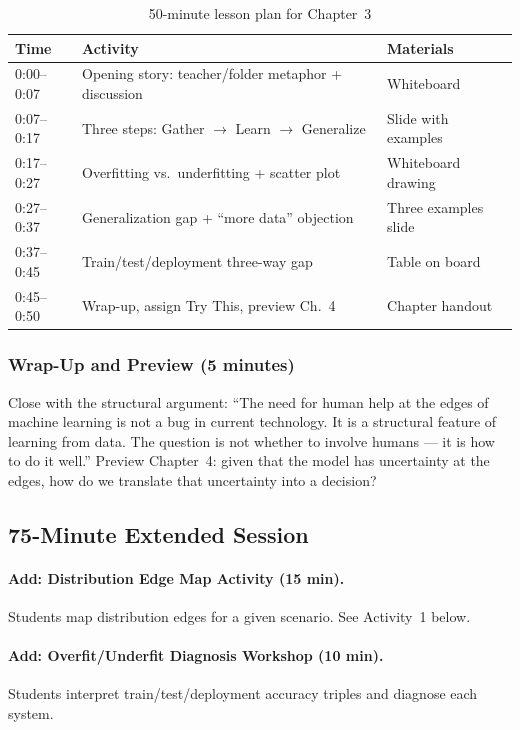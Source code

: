 \begin{table}[htbp]
\caption{50-minute lesson plan for Chapter~3}
\label{tab:lesson-plan-ch03}
\centering
\begin{tabular}{@{}p{2.5cm}p{6cm}p{4cm}@{}}
\toprule
\textbf{Time} & \textbf{Activity} & \textbf{Materials} \\
\midrule
0:00--0:07 & Opening story: teacher/folder metaphor + discussion & Whiteboard \\
0:07--0:17 & Three steps: Gather $\to$ Learn $\to$ Generalize & Slide with examples \\
0:17--0:27 & Overfitting vs.\ underfitting + scatter plot & Whiteboard drawing \\
0:27--0:37 & Generalization gap + ``more data'' objection & Three examples slide \\
0:37--0:45 & Train/test/deployment three-way gap & Table on board \\
0:45--0:50 & Wrap-up, assign Try This, preview Ch.\ 4 & Chapter handout \\
\bottomrule
\end{tabular}
\end{table}

\subsubsection{Wrap-Up and Preview (5 minutes)}
Close with the structural argument: ``The need for human help at the edges of machine learning is not a bug in current technology. It is a structural feature of learning from data. The question is not whether to involve humans --- it is how to do it well.'' Preview Chapter~4: given that the model has uncertainty at the edges, how do we translate that uncertainty into a decision?

\subsection{75-Minute Extended Session}

\paragraph{Add: Distribution Edge Map Activity (15 min).}
Students map distribution edges for a given scenario. See Activity~1 below.

\paragraph{Add: Overfit/Underfit Diagnosis Workshop (10 min).}
Students interpret train/test/deployment accuracy triples and diagnose each system.

